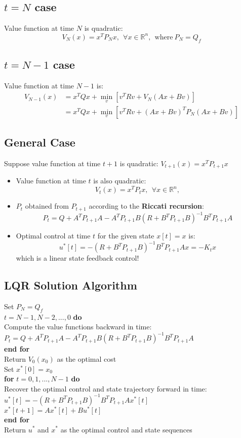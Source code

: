 \documentclass[10pt,a4paper,oneside]{article}
\begin{document}
\subsection{$t=N$ case}
Value function at time $N$ is quadratic:
\[
V_N(x)=x^TP_Nx,\ \ \forall x\in \mathbb{R}^n,\ \ \text{where} \ P_N=Q_f
\]
\subsection{$t=N-1$ case}
Value function at time $N-1$ is:
$$
\begin{aligned}
V_{N-1}(x)&=x^TQx+\min_{v}[v^TRv+V_{N}(Ax+Bv)]\\&=x^TQx+\min_{v}[v^TRv+(Ax+Bv)^TP_N(Ax+Bv)]
\end{aligned}
$$
\subsection{General Case}
Suppose value function at time $t+1$ is quadratic: $V_{t+1}(x)=x^TP_{t+1}x$
\begin{itemize}
	\item Value function at time $t$ is also quadratic:
	\[
	V_t(x)=x^TP_tx,\ \  \forall x\in \mathbb{R}^n,
	\]
	\item $P_t$ obtained from $P_{t+1}$ according to the {\bfseries Riccati recursion}:
	\[
	P_t=Q+A^TP_{t+1}A - A^TP_{t+1}B(R+B^TP_{t+1}B)^{-1}B^TP_{t+1}A
	\]
	\item Optimal control at time $t$ for the given state $x[t]=x$ is:
	\[
	u^*[t] = -(R+B^TP_{t+1}B)^{-1}B^TP_{t+1}Ax=-K_tx
	\]
	which is a linear state feedback control!
\end{itemize}
\subsection{LQR Solution Algorithm}
\begin{framed}
	\noindent Set $P_N=Q_f$\\
	 $t=N-1,N-2,...,0$ {\bfseries do}\\
	\indent Compute the value functions backward in time:\\
	\indent $P_t=Q+A^TP_{t+1}A - A^TP_{t+1}B(R+B^TP_{t+1}B)^{-1}B^TP_{t+1}A$\\
	{\bfseries end for}\\
	Return $V_0(x_0)$ as the optimal cost\\
	Set $x^*[0]=x_0$\\
	{\bfseries for} $t=0,1,...,N-1$ {\bfseries do}\\
	\indent Recover the optimal control and state trajectory forward in time:\\
	\indent $u^*[t]=-(R+B^TP_{t+1}B)^{-1}B^TP_{t+1}Ax^*[t]$\\
	\indent $x^*[t+1]=Ax^*[t]+Bu^*[t]$\\
	{\bfseries end for}\\
	Return $u^*$ and $x^*$ as the optimal control and state sequences
\end{framed}
\end{document}
